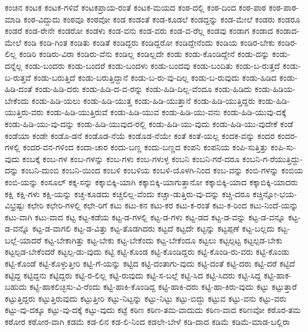 {ಕಂಚಿನ
ಕಂಟಕ
ಕಂಟಕ-ಗಳಿವೆ
ಕಂಟಕಪ್ರಾಯ-ರಂತೆ
ಕಂಟಕ-ಮಯದ
ಕಂಠ-ದಲ್ಲಿ
ಕಂಠ-ದಿಂದ
ಕಂಠ-ಪಾಠ
ಕಂಠ-ಪಾಠ-ಮಾಡಿ
ಕಂಠ-ವಿದ್ದುದು
ಕಂಠವೂ
ಕಂಠವೋ
ಕಂಡ
ಕಂಡಂತೆ
ಕಂಡ-ಕೂಡಲೆ
ಕಂಡದ್ದನ್ನು
ಕಂಡ-ಮೇಲೆ
ಕಂಡರು
ಕಂಡರೂ
ಕಂಡರೆ
ಕಂಡ-ರೇನೇ
ಕಂಡರೋ
ಕಂಡಳು
ಕಂಡ-ವನು
ಕಂಡ-ವರು
ಕಂಡ-ವ-ರೆಲ್ಲ
ಕಂಡವು
ಕಂಡಾಗ
ಕಂಡಾದ
ಕಂಡಾದ-ಮೇಲೆ
ಕಂಡಿ
ಕಂಡಿ-ಗಿಂತ
ಕಂಡಿತು
ಕಂಡಿತೆ
ಕಂಡಿದ್ದರು
ಕಂಡಿದ್ದರೋ
ಕಂಡಿದ್ದೇನೆಂದು
ಕಂಡಿಯ
ಕಂಡಿರ-ಬೇಕು
ಕಂಡಿರ-ಲಿಲ್ಲ
ಕಂಡಿರಿ
ಕಂಡಿರು-ವಿರಾ
ಕಂಡಿರು-ವೆನು
ಕಂಡಿಲ್ಲ
ಕಂಡಿಲ್ಲದೇ
ಕಂಡು
ಕಂಡು-ಕೊಂಡಿದ್ದೇನೆ
ಕಂಡು-ದನ್ನು
ಕಂಡು-ದನ್ನೆಲ್ಲ
ಕಂಡು-ಬಂದರು
ಕಂಡು-ಬಂದರೆ
ಕಂಡು-ಬಂದಳು
ಕಂಡು-ಬಂದವು
ಕಂಡು-ಬಂದಿತು
ಕಂಡು-ಬ-ರುತ್ತದೆ
ಕಂಡು-ಬ-ರುತ್ತವೆ
ಕಂಡು-ಬರುತ್ತಿದೆ
ಕಂಡು-ಬರುತ್ತಿದ್ದಾನೆ
ಕಂಡು-ಬ-ರು-ವು-ದಿಲ್ಲ
ಕಂಡು-ಬ-ರುವುದು
ಕಂಡು-ಹಿಡಿದ
ಕಂಡು-ಹಿಡಿ-ದಂತೆ
ಕಂಡು-ಹಿಡಿ-ದರು
ಕಂಡು-ಹಿಡಿ-ದ-ವ-ರನ್ನು
ಕಂಡು-ಹಿಡಿ-ದಿಲ್ಲ-ವೆಂದೂ
ಕಂಡು-ಹಿಡಿದು
ಕಂಡು-ಹಿಡಿಯ-ಬೇಕೆಂದು
ಕಂಡು-ಹಿಡಿ-ಯಲು
ಕಂಡು-ಹಿಡಿ-ಯುತ್ತ
ಕಂಡು-ಹಿಡಿ-ಯುತ್ತಾನೆ
ಕಂಡು-ಹಿಡಿ-ಯುತ್ತಿದ್ದರು
ಕಂಡು-ಹಿಡಿ-ಯುತ್ತಿರು-ವರು
ಕಂಡು-ಹಿಡಿ-ಯುತ್ತಿರುವೆ
ಕಂಡು-ಹಿಡಿ-ಯುವ
ಕಂಡು-ಹಿಡಿ-ಯು-ವನು
ಕಂಡು-ಹಿಡಿ-ಯುವು-ದಕ್ಕೆ
ಕಂಡು-ಹಿಡಿ-ಯು-ವು-ದನ್ನು
ಕಂಡು-ಹಿಡಿ-ಯುವುದ-ರಲ್ಲಿ
ಕಂಡು-ಹಿಡಿ-ಯು-ವುದು
ಕಂಡು-ಹಿಡಿ-ಯು-ವುದೇಕೆ
ಕಂಡೆ
ಕಂಡೆಯಾ
ಕಂಡೇ
ಕಂಡೊ-ಡನೆ
ಕಂಡೊಡ-ನೆಯೆ
ಕಂಡೊಡ-ನೆಯೇ
ಕಂತೆ
ಕಂತೆ-ಯಲ್ಲ
ಕಂದಕ-ವನ್ನು
ಕಂದರ
ಕಂದರ-ಗಳಲ್ಲಿ
ಕಂದರ-ವನ-ಗಳಿಂದ
ಕಂದಾ-ಚಾರ
ಕಂದು-ಬಣ್ಣ
ಕಂದು-ಬಣ್ಣದ
ಕಂಪನಿ
ಕಂಪನಿಯ
ಕಂಪಿ-ಸುತ್ತಿತ್ತು
ಕಂಪಿ-ಸು-ವುದು
ಕಂಬಕ್ಕೆ
ಕಂಬ-ಗಳ
ಕಂಬ-ಗಳನ್ನು
ಕಂಬ-ಗಳು
ಕಂಬ-ಗಳುಳ್ಳ
ಕಂಬನಿ
ಕಂಬನಿ-ಗರೆ-ದರೂ
ಕಂಬನಿ-ಗ-ರೆಯುತ್ತಿದ್ದು-ದನ್ನು
ಕಂಬನಿ-ದುಂಬಿ
ಕಂಬನಿ-ಯಿಂದ
ಕಂಬಳಿ
ಕಂಬಳಿಯ
ಕಂಬಳಿ-ಯೊಳಗಿ-ನಿಂದ
ಕಂಬ-ವನ್ನು
ಕಂಬಿ-ಗಳನ್ನು
ಕಂಬಿಯ
ಕಂಬಿ-ಯನ್ನು
ಕಂಸೂಲ್
ಕಕ್ಕ-ಸನ್ನು
ಕಕ್ಕಾಬಿಕ್ಕಿ-ಯಾಗಿ
ಕಕ್ಕಾಬಿಕ್ಕಿ-ಯಾಗುತ್ತಾನೋ
ಕಕ್ಕಾಬಿಕ್ಕಿ-ಯಾದ
ಕಕ್ಕಾಬಿಕ್ಕಿ-ಯಾದರು
ಕಕ್ಷಿ
ಕಕ್ಷಿ-ಗಳು
ಕಕ್ಷಿ-ಯನ್ನು
ಕಚ್ಚ-ಕೂಡದು
ಕಚ್ಚಲಿಲ್ಲ-ವೆಂದು
ಕಚ್ಚಾ-ಡುತ್ತಿರು-ವು-ದನ್ನು
ಕಚ್ಚಿ-ದರೂ
ಕಚ್ಚಿನ್ನೋ-ಭಯ-ವಿಭ್ರಷ್ಟಃ
ಕಛೇರಿ
ಕಛೇರಿ-ಗಳಲ್ಲಿ
ಕಛೇ-ರಿಗೆ
ಕಟು
ಕಟು-ಕನ
ಕಟು-ಕರ
ಕಟು-ಕ-ರಂತೆ
ಕಟು-ಕ-ರಿಂದ
ಕಟು-ನಿಂದೆ-ಯನ್ನು
ಕಟು-ವಾಗಿ
ಕಟು-ವಾದ
ಕಟ್ಟ
ಕಟ್ಟ-ಕಡೆಯ
ಕಟ್ಟ-ಡ-ಗಳಲ್ಲಿ
ಕಟ್ಟ-ಡ-ಗಳು
ಕಟ್ಟ-ಡದ
ಕಟ್ಟ-ಡ-ವನ್ನು
ಕಟ್ಟ-ಡ-ವನ್ನೂ
ಕಟ್ಟ-ಡ-ವನ್ನೊ
ಕಟ್ಟ-ಡ-ವಾಗಲಿ
ಕಟ್ಟ-ಡ-ವಿತ್ತು
ಕಟ್ಟ-ತೊಡಗಿದರು
ಕಟ್ಟದೆ
ಕಟ್ಟದೇ
ಕಟ್ಟನ್ನು
ಕಟ್ಟಪ್ಪಣೆ
ಕಟ್ಟ-ಬಲ್ಲದು
ಕಟ್ಟ-ಬಲ್ಲೆ-ಯಾದರೆ
ಕಟ್ಟ-ಬೇಕಾಗಿತ್ತು
ಕಟ್ಟ-ಬೇಕು
ಕಟ್ಟ-ಬೇಕೆಂದು
ಕಟ್ಟ-ಬೇಕೆಂದೂ
ಕಟ್ಟಲು
ಕಟ್ಟಲ್ಪಟ್ಟ
ಕಟ್ಟಲ್ಪಡ-ಬೇಕು
ಕಟ್ಟಲ್ಪಡ-ಬೇಕೆಂದರೆ
ಕಟ್ಟಲ್ಪ-ಡು-ವುದು
ಕಟ್ಟಿ
ಕಟ್ಟಿ-ಕೊಂಡ
ಕಟ್ಟಿ-ಕೊಂಡಿದ್ದರು
ಕಟ್ಟಿ-ಕೊಂಡಿ-ರು-ವರು
ಕಟ್ಟಿ-ಕೊಂಡು
ಕಟ್ಟಿ-ಕೊಂಡೆ
ಕಟ್ಟಿ-ಕೊಳ್ಳುತ್ತೀರಿ
ಕಟ್ಟಿ-ಗೆ-ಯನ್ನು
ಕಟ್ಟಿದ
ಕಟ್ಟಿ-ದಂತಾಗು-ವುದು
ಕಟ್ಟಿ-ದಂತೆ
ಕಟ್ಟಿ-ದರು
ಕಟ್ಟಿ-ದರೆ
ಕಟ್ಟಿದೆ
ಕಟ್ಟಿದ್ದ
ಕಟ್ಟಿದ್ದನು
ಕಟ್ಟಿದ್ದರು
ಕಟ್ಟಿ-ರ-ಲಿಲ್ಲ
ಕಟ್ಟಿ-ರುವುದು
ಕಟ್ಟಿ-ಸ-ಬಲ್ಲೆ
ಕಟ್ಟಿ-ಸಿದ
ಕಟ್ಟಿ-ಸಿದರು
ಕಟ್ಟಿ-ಸಿದ್ದ
ಕಟ್ಟಿ-ಹಾಕ-ಬಹುದು
ಕಟ್ಟಿ-ಹಾಕಲಿಚ್ಛಿಸು-ವಿ-ರೆಂದು
ಕಟ್ಟಿ-ಹಾಕಿ-ಕೊಂಡಿದ್ದ
ಕಟ್ಟಿ-ಹಾಕಿ-ದರು
ಕಟ್ಟಿ-ಹಾ-ಕಿರು-ವುದು
ಕಟ್ಟು
ಕಟ್ಟುತ್ತಾರೆ
ಕಟ್ಟುತ್ತಿದ್ದರು
ಕಟ್ಟುತ್ತಿರುವುದು
ಕಟ್ಟುತ್ತೀರಿ
ಕಟ್ಟು-ನಿಟ್ಟನ್ನು
ಕಟ್ಟು-ನಿಟ್ಟು
ಕಟ್ಟು-ಬಿದ್ದು
ಕಟ್ಟುವ
ಕಟ್ಟು-ವನು
ಕಟ್ಟು-ವರು
ಕಟ್ಟು-ವು-ದಕ್ಕೂ
ಕಟ್ಟು-ವು-ದಕ್ಕೆ
ಕಟ್ಟು-ವುದು
ಕಟ್ಟೆ
ಕಠಿಣ
ಕಠಿಣ-ತಮ-ವಾದುದು
ಕಠಿಣ-ವಾದ
ಕಠಿಣವೋ
ಕಠೊರ-ತಮ
ಕಠೋರ
ಕಠೋರ-ವಾಗಿ
ಕಡಮೆ
ಕಡ-ಲಿನ
ಕಡ-ಲಿ-ನಿಂದ
ಕಡಲೇ-ಬೇಳೆ
ಕಡಿ-ದಾದ
ಕಡಿಮೆ
ಕಡಿಮೆ-ಮಾಡ-ಬಲ್ಲಿರಾ
}
